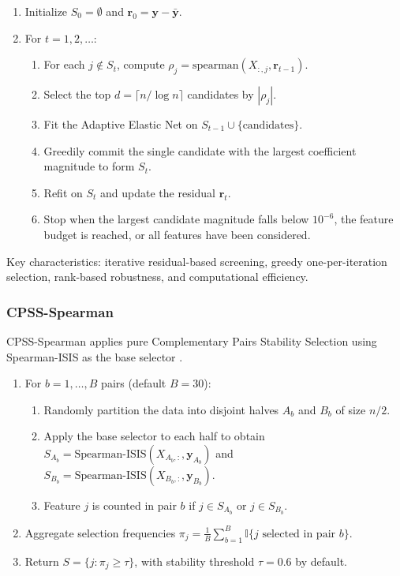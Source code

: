 \documentclass[11pt]{article}
\begin{document}
\begin{enumerate}
\item Initialize $S_0 = \emptyset$ and $\mathbf{r}_0 = \mathbf{y} - \bar{\mathbf{y}}$.
\item For $t = 1, 2, \dots$:
  \begin{enumerate}
  \item For each $j \notin S_t$, compute $\rho_j = \mathrm{spearman}(X_{:,j}, \mathbf{r}_{t-1})$.
  \item Select the top $d = \lceil n / \log n \rceil$ candidates by $|\rho_j|$.
  \item Fit the Adaptive Elastic Net on $S_{t-1} \cup \{\text{candidates}\}$.
  \item Greedily commit the single candidate with the largest coefficient magnitude to form $S_t$.
  \item Refit on $S_t$ and update the residual $\mathbf{r}_t$.
  \item Stop when the largest candidate magnitude falls below $10^{-6}$, the feature budget is
  reached, or all features have been considered.
  \end{enumerate}
\end{enumerate}

Key characteristics: iterative residual-based screening, greedy one-per-iteration selection,
rank-based robustness, and computational efficiency.

\subsubsection{CPSS-Spearman}

CPSS-Spearman applies pure Complementary Pairs Stability Selection using Spearman-ISIS as the base
selector \citep{meinshausen2010,shah2013}.

\begin{enumerate}
\item For $b = 1, \dots, B$ pairs (default $B = 30$):
  \begin{enumerate}
  \item Randomly partition the data into disjoint halves $A_b$ and $B_b$ of size $n/2$.
  \item Apply the base selector to each half to obtain
  $S_{A_b} = \text{Spearman-ISIS}(X_{A_b,:}, \mathbf{y}_{A_b})$ and
  $S_{B_b} = \text{Spearman-ISIS}(X_{B_b,:}, \mathbf{y}_{B_b})$.
  \item Feature $j$ is counted in pair $b$ if $j \in S_{A_b}$ or $j \in S_{B_b}$.
  \end{enumerate}
\item Aggregate selection frequencies
$\pi_j = \tfrac{1}{B}\sum_{b=1}^{B} \mathbb{I}\{j \text{ selected in pair } b\}$.
\item Return $S = \{j : \pi_j \ge \tau\}$, with stability threshold $\tau = 0.6$ by default.
\end{enumerate}
\end{document}
